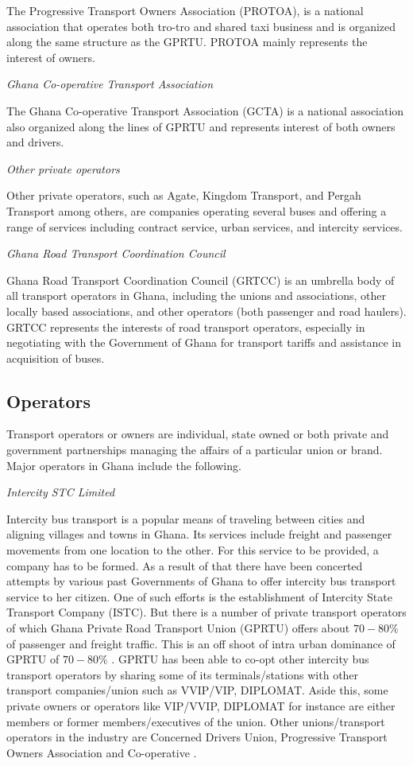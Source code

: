 The Progressive Transport Owners Association (PROTOA), is a national association that operates both tro-tro and shared taxi business and is organized along the same structure as the GPRTU. PROTOA mainly represents the interest of owners. 

\textit{Ghana Co-operative Transport Association}

The Ghana Co-operative Transport Association (GCTA) is a national association also organized along the lines of GPRTU and represents interest of both owners and drivers.

\textit{Other private operators}

Other private operators, such as Agate, Kingdom Transport, and Pergah Transport among others, are companies operating several buses and offering a range of services including contract service, urban services, and intercity services.

\textit{Ghana Road Transport Coordination Council}

Ghana Road Transport Coordination Council (GRTCC) is an umbrella body of all transport operators in Ghana, including the unions and associations, other locally based associations, and other operators (both passenger and road haulers). GRTCC represents the interests of road transport operators, especially in negotiating with the Government of Ghana for transport tariffs and assistance in acquisition of buses.

\subsection{Operators}
Transport operators or owners are individual, state owned or both private and government partnerships managing the affairs of a particular union or brand. Major operators in Ghana include the following.

\textit{Intercity STC Limited}

Intercity bus transport is a popular means of traveling between cities and aligning villages and towns in Ghana. Its services include freight and passenger movements from one location to the other. For this service to be provided, a company has to be formed. As a result of that there have been concerted attempts by various past Governments of Ghana to offer intercity bus transport service to her citizen. One of such efforts is the establishment of Intercity State Transport Company (ISTC). But there is a number of private transport operators 
of which Ghana Private Road Transport Union (GPRTU) offers about $70-80\%$ of passenger and freight traffic. This is an off shoot of intra urban dominance of GPRTU of $70-80\%$ \citep{abane2011travel}. GPRTU has been able to co-opt other intercity bus transport operators by sharing some of its terminals/stations with other transport 
companies/union such as VVIP/VIP, DIPLOMAT. Aside this, some private owners or operators like VIP/VVIP, DIPLOMAT for instance are either members or former members/executives of the union. Other unions/transport operators in the industry are Concerned Drivers Union, Progressive Transport Owners Association and Co-operative \citep{ojobus}.

